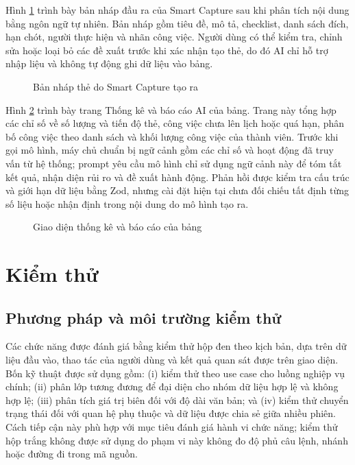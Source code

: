 \documentclass[../DoAn.tex]{subfiles}
\begin{document}
Hình \ref{fig:chapter4_result_smart_capture} trình bày bản nháp đầu ra của Smart Capture sau khi phân tích nội dung bằng ngôn ngữ tự nhiên. Bản nháp gồm tiêu đề, mô tả, checklist, danh sách đích, hạn chót, người thực hiện và nhãn công việc. Người dùng có thể kiểm tra, chỉnh sửa hoặc loại bỏ các đề xuất trước khi xác nhận tạo thẻ, do đó AI chỉ hỗ trợ nhập liệu và không tự động ghi dữ liệu vào bảng.

\begin{figure}[H]
    \centering
    \caption{Bản nháp thẻ do Smart Capture tạo ra}
    \label{fig:chapter4_result_smart_capture}
\end{figure}

Hình \ref{fig:chapter4_result_analytics} trình bày trang Thống kê và báo cáo AI của bảng. Trang này tổng hợp các chỉ số về số lượng và tiến độ thẻ, công việc chưa lên lịch hoặc quá hạn, phân bố công việc theo danh sách và khối lượng công việc của thành viên. Trước khi gọi mô hình, máy chủ chuẩn bị ngữ cảnh gồm các chỉ số và hoạt động đã truy vấn từ hệ thống; prompt yêu cầu mô hình chỉ sử dụng ngữ cảnh này để tóm tắt kết quả, nhận diện rủi ro và đề xuất hành động. Phản hồi được kiểm tra cấu trúc và giới hạn dữ liệu bằng Zod, nhưng cài đặt hiện tại chưa đối chiếu tất định từng số liệu hoặc nhận định trong nội dung do mô hình tạo ra.

\begin{figure}[H]
    \centering
    \caption{Giao diện thống kê và báo cáo của bảng}
    \label{fig:chapter4_result_analytics}
\end{figure}

\section{Kiểm thử}
\label{section:4.4}

\subsection{Phương pháp và môi trường kiểm thử}
\label{subsection:4.4.1}

Các chức năng được đánh giá bằng kiểm thử hộp đen theo kịch bản, dựa trên dữ liệu đầu vào, thao tác của người dùng và kết quả quan sát được trên giao diện. Bốn kỹ thuật được sử dụng gồm: (i) kiểm thử theo use case cho luồng nghiệp vụ chính; (ii) phân lớp tương đương để đại diện cho nhóm dữ liệu hợp lệ và không hợp lệ; (iii) phân tích giá trị biên đối với độ dài văn bản; và (iv) kiểm thử chuyển trạng thái đối với quan hệ phụ thuộc và dữ liệu được chia sẻ giữa nhiều phiên. Cách tiếp cận này phù hợp với mục tiêu đánh giá hành vi chức năng; kiểm thử hộp trắng không được sử dụng do phạm vi này không đo độ phủ câu lệnh, nhánh hoặc đường đi trong mã nguồn.
\end{document}
